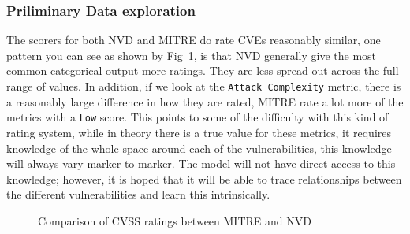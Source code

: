\documentclass[12pt]{article}
\begin{document}
\subsubsection{Priliminary Data exploration}

The scorers for both NVD and MITRE do rate CVEs reasonably similar, one pattern you can see as shown
by Fig~\ref{fig:counts}, is that NVD generally give the most common categorical output more ratings.
They are less spread out across the full range of values. In addition, if we look at the
\texttt{Attack Complexity} metric, there is a reasonably large difference in how they are rated,
MITRE rate a lot more of the metrics with a \texttt{Low} score. This points to some of the
difficulty with this kind of rating system, while in theory there is a true value for these metrics,
it requires knowledge of the whole space around each of the vulnerabilities, this knowledge will
always vary marker to marker. The model will not have direct access to this knowledge; however, it
is hoped that it will be able to trace relationships between the different vulnerabilities and learn
this intrinsically.


\begin{figure}
	\centering
	\caption{\label{fig:counts}Comparison of CVSS ratings between MITRE and NVD}
\end{figure}
\end{document}

